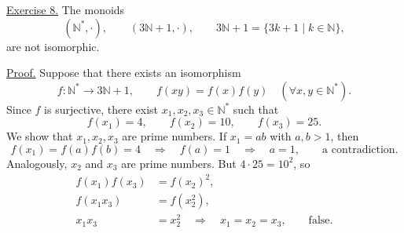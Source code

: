 \smallskip
{}

\medskip
\noindent\underline{Exercise 8.}
The monoids
\[
 (\mathbb N^*,\cdot),\qquad
 (3\mathbb N+1,\cdot),\qquad
 3\mathbb N+1=\{3k+1\mid k\in\mathbb N\},
\]
are not isomorphic.

\noindent\underline{Proof.}
Suppose that there exists an isomorphism
\[
 f:\mathbb N^*\longrightarrow 3\mathbb N+1,
 \qquad f(xy)=f(x)f(y)
 \quad(\forall x,y\in\mathbb N^*).
\]
Since $f$ is surjective, there exist $x_1,x_2,x_3\in\mathbb N^*$
such that
\[
 f(x_1)=4,\qquad f(x_2)=10,\qquad f(x_3)=25.
\]
We show that $x_1,x_2,x_3$ are prime numbers.
If $x_1=ab$ with $a,b>1$, then
\[
 f(x_1)=f(a)f(b)=4
 \quad\Longrightarrow\quad f(a)=1
 \quad\Longrightarrow\quad a=1,
 \qquad\text{a contradiction.}
\]
Analogously, $x_2$ and $x_3$ are prime numbers.
But $4\cdot25=10^2$, so
\[
\begin{aligned}
 f(x_1)f(x_3)&=f(x_2)^2,\\
 f(x_1x_3)&=f(x_2^2),\\
 x_1x_3&=x_2^2
  \quad\Longrightarrow\quad x_1=x_2=x_3,
  \qquad\text{false.}
\end{aligned}
\]
